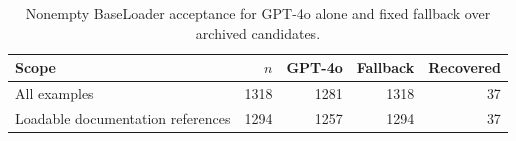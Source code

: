 \begin{table}[H]
\centering\small
\caption{Nonempty BaseLoader acceptance for GPT-4o alone and fixed fallback over archived candidates.}
\label{tab:fallback}
\begin{tabular}{@{}lrrrr@{}}
\toprule
Scope & $n$ & GPT-4o & Fallback & Recovered\\
\midrule
All examples & 1318 & 1281 & 1318 & 37\\
Loadable documentation references & 1294 & 1257 & 1294 & 37\\
\bottomrule
\end{tabular}
\par\vspace{0.3em}{\footnotesize The second row uses SafeLoader-loadable raw documentation references. Both policies retain 16 exact matches after outer-whitespace stripping; functional success is unmeasured.}
\end{table}
